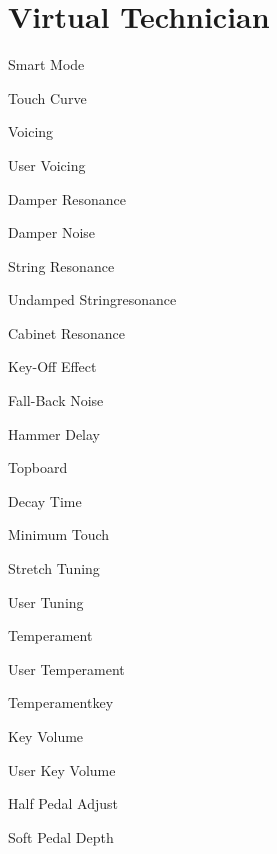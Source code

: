 \section{Virtual Technician}

Smart Mode


Touch Curve




Voicing

User Voicing

Damper Resonance


Damper Noise

String Resonance


Undamped Stringresonance

Cabinet Resonance

Key-Off Effect


Fall-Back Noise

Hammer Delay


Topboard

Decay Time

Minimum Touch


Stretch Tuning

User Tuning


Temperament

User Temperament

Temperamentkey


Key Volume

User Key Volume


Half Pedal Adjust

Soft Pedal Depth
